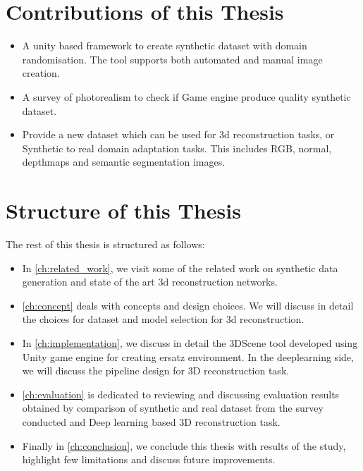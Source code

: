 
\section{Contributions of this Thesis}\label{ss:contributions}
\begin{itemize}
    \item A unity based framework to create synthetic dataset with domain randomisation.
    The tool supports both automated and manual image creation.
    \item A survey of photorealism to check if Game engine produce quality synthetic dataset.
    \item Provide a new dataset which can be used for 3d reconstruction tasks, or Synthetic to real domain adaptation tasks. This includes RGB, normal, depthmaps and semantic segmentation images.
\end{itemize}


\section{Structure of this Thesis}

The rest of this thesis is structured as follows:

\begin{itemize}
    \item In \autoref{ch:related_work}, we visit some of the related work on synthetic data generation and state of the art 3d reconstruction networks.
    \item \autoref{ch:concept} deals with concepts and design choices. We will discuss in detail the choices for dataset and model selection for 3d reconstruction.
    \item In \autoref{ch:implementation}, we discuss in detail the 3DScene tool developed using Unity game engine for creating ersatz environment. In the deeplearning side, we will discuss the pipeline design for 3D reconstruction task.
    \item \autoref{ch:evaluation} is dedicated to reviewing and discussing evaluation results obtained by comparison of synthetic and real dataset from the survey conducted and Deep learning based 3D reconstruction task.
    \item Finally in \autoref{ch:conclusion}, we conclude this thesis with results of the study, highlight few limitations and discuss future improvements.
\end{itemize}